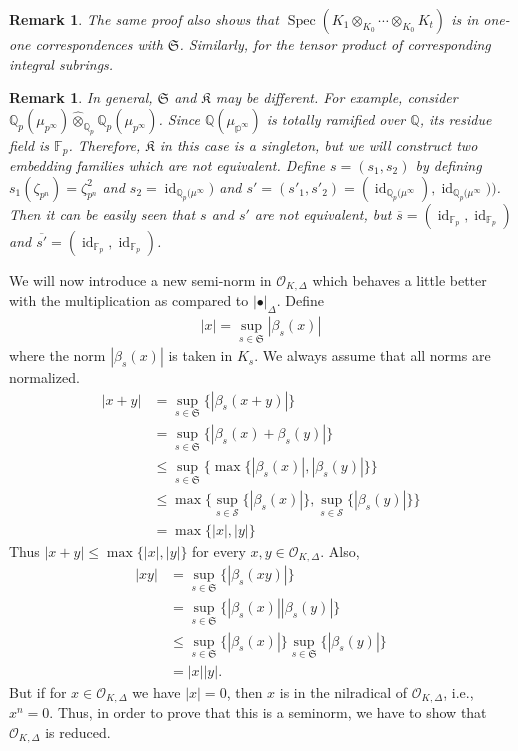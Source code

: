 \documentclass[12pts,a4paper]{amsart}
\newtheorem{remark}[proposition]{Remark}
\DeclareMathOperator{\spec}{Spec}
\DeclareMathOperator{\id}{id}
\begin{document}
\begin{remark}
    The same proof also shows that $\spec (K_1\otimes_{K_0}\cdots\otimes_{K_0} K_t)$ is in one-one correspondences with $\mathfrak{S}$. Similarly, for the tensor product of corresponding integral subrings.
\end{remark}

\begin{remark}
    In general, $\mathfrak{S}$ and $\mathfrak{K}$ may be different. For example, consider $\mathbb{Q}_p(\mu_{p^\infty})\hat{\otimes}_{\mathbb{Q}_p}\mathbb{Q}_p(\mu_{p^\infty})$. Since $\mathbb{Q(\mu_{p^\infty})}$ is totally ramified over $\mathbb{Q}$, its residue field is $\mathbb{F}_p$. Therefore, $\mathfrak{K}$ in this case is a singleton, but we will construct two embedding families which are not equivalent. Define $s=(s_1,s_2)$ by defining $s_1(\zeta_{p^n})=\zeta^2_{p^n}$ and $s_2=\id_{\mathbb{Q}_p(\mu^\infty})$ and $s'=(s'_1,s'_2)=(\id_{\mathbb{Q}_p(\mu^\infty}),\id_{\mathbb{Q}_p(\mu^\infty}))$. Then it can be easily seen that $s$ and $s'$ are not equivalent, but $\overline{s}=(\id_{\mathbb{F}_p},\id_{\mathbb{F}_p})$ and $\overline{s'}=(\id_{\mathbb{F}_p},\id_{\mathbb{F}_p})$.  
\end{remark}
 
We will now introduce a new semi-norm in $\mathcal{O}_{K,\Delta}$ which behaves a little better with the multiplication as compared to $|\bullet|_\Delta$. Define
\begin{align*}
	|x|=\sup\limits_{s\in\mathfrak{S}}|\beta_s(x)|
\end{align*}
where the norm $|\beta_s(x)|$ is taken in $K_s$. We always assume that all norms are normalized.
\begin{align*}
	|x+y|&=\sup\limits_{s\in\mathfrak{S}}\{|\beta_s(x+y)|\}\\
	        &=\sup\limits_{s\in\mathfrak{S}}\{|\beta_s(x)+\beta_s(y)|\}\\
	        &\leq\sup\limits_{s\in\mathfrak{S}}\Big\{\max\{|\beta_s(x)|,|\beta_s(y)|\}\Big\}\\
	        &\leq \max\Big\{\sup\limits_{s\in\mathcal{S}}\{|\beta_s(x)|\},\sup\limits_{s\in\mathcal{S}}\{|\beta_s(y)|\}\Big\}\\
	        &=\max\{|x|,|y|\}
\end{align*}
Thus $|x+y|\leq\max\{|x|,|y|\}$ for every $x,y\in\mathcal{O}_{K,\Delta}$. Also,
\begin{align*}
	|xy|&=\sup\limits_{s\in\mathfrak{S}}\{|\beta_s(xy)|\}\\
	     &=\sup\limits_{s\in\mathfrak{S}}\{|\beta_s(x)||\beta_s(y)|\}\\
	     &\leq \sup\limits_{s\in\mathfrak{S}}\{|\beta_s(x)|\}\sup\limits_{s\in\mathfrak{S}}\{|\beta_s(y)|\}\\
	     &=|x||y|.
\end{align*}
But if for $x \in \mathcal{O}_{K,\Delta}$ we have $|x| = 0$, then $x$ is in the nilradical of $\mathcal{O}_{K,\Delta}$, i.e., $x^n = 0$. Thus, in order to prove that this is a seminorm, we have to show that $\mathcal{O}_{K,\Delta}$ is reduced.
\end{document}
